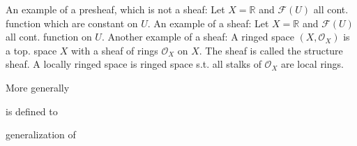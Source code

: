 An example of a presheaf, which is not a sheaf: Let \( X = \mathbb{R} \) and \( \mathcal{F}(U) \) all cont. function which are constant on \( U \).
An example of a sheaf: Let \( X = \mathbb{R} \) and \( \mathcal{F}(U) \) all cont. function on \( U \).
Another example of a sheaf: A ringed space \( (X, \mathcal{O}_X) \) is a top. space \( X \) with a sheaf of rings \( \mathcal{O}_X \) on \( X \).
The sheaf is called the structure sheaf.
A locally ringed space is ringed space s.t. all stalks of \( \mathcal{O}_X \) are local rings.

More generally 

is defined to 

generalization of
